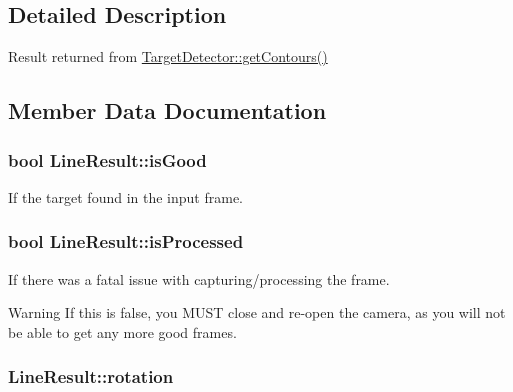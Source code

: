 \subsection{Detailed Description}
Result returned from \hyperlink{classTargetDetector_a4e0da3406dc29ce871dbfbb233a5ab5c}{Target\+Detector\+::get\+Contours()} 

\subsection{Member Data Documentation}
\hypertarget{structLineResult_ae4c2b3bf916f316b60718ad11731468e}{}
\subsubsection[{is\+Good}]{\setlength{\rightskip}{0pt plus 5cm}bool Line\+Result\+::is\+Good}\label{structLineResult_ae4c2b3bf916f316b60718ad11731468e}


If the target found in the input frame. 

\hypertarget{structLineResult_a6f6cdb0eaa8db8be8cd08bc3cd3aace0}{}
\subsubsection[{is\+Processed}]{\setlength{\rightskip}{0pt plus 5cm}bool Line\+Result\+::is\+Processed}\label{structLineResult_a6f6cdb0eaa8db8be8cd08bc3cd3aace0}


If there was a fatal issue with capturing/processing the frame. 

\begin{DoxyWarning}{Warning}
If this is false, you M\+U\+S\+T close and re-\/open the camera, as you will not be able to get any more good frames. 
\end{DoxyWarning}
\hypertarget{structLineResult_a840b6b2aab3009238f1520a84093f8b1}{}
\subsubsection[{rotation}]{ Line\+Result\+::rotation}\label{structLineResult_a840b6b2aab3009238f1520a84093f8b1}


